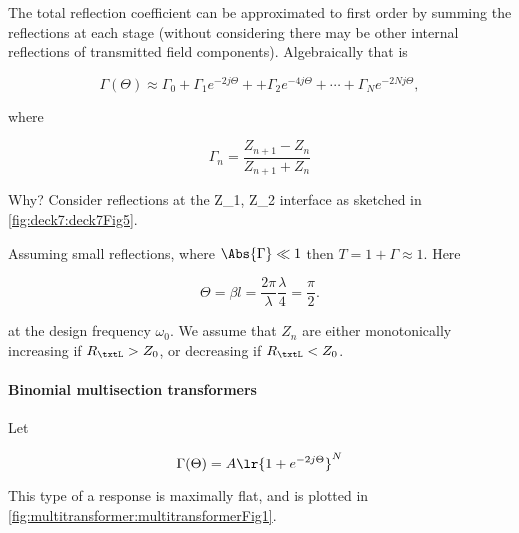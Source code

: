 The total reflection coefficient can be approximated to first order by summing the reflections at each stage (without considering there may be other internal reflections of transmitted field components).  Algebraically that is

\begin{equation}\label{eqn:uwavesDeck7MultisectionTransformersCore:60}
\Gamma(\Theta) \approx \Gamma_0
+ \Gamma_1 e^{-2 j \Theta} +
+ \Gamma_2 e^{-4 j \Theta} +  \cdots
+ \Gamma_N e^{-2 N j \Theta},
\end{equation}

where

\begin{equation}\label{eqn:uwavesDeck7MultisectionTransformersCore:80}
\Gamma_n = \frac{Z_{n+1} - Z_n}{Z_{n+1} + Z_n}
\end{equation}

Why?  Consider reflections at the Z_1, Z_2 interface as sketched in \cref{fig:deck7:deck7Fig5}.


Assuming small reflections, where \( \Abs{\Gamma} \ll 1 \) then \( T = 1 + \Gamma \approx 1 \).  Here

\begin{dmath}\label{eqn:uwavesDeck7MultisectionTransformersCore:100}
\Theta
= \beta l
= \frac{2 \pi}{\lambda} \frac{\lambda}{4}
= \frac{\pi}{2}.
\end{dmath}

at the design frequency \( \omega_0 \).  We assume that \( Z_n \) are either monotonically increasing if \( R_\txtL > Z_0 \), or decreasing if \( R_\txtL < Z_0 \).

\paragraph{Binomial multisection transformers}

Let

\begin{equation}\label{eqn:uwavesDeck7MultisectionTransformersCore:120}
\Gamma(\Theta) = A \lr{ 1 + e^{-2 j \Theta} }^N
\end{equation}

This type of a response is maximally flat, and is plotted in \cref{fig:multitransformer:multitransformerFig1}.

